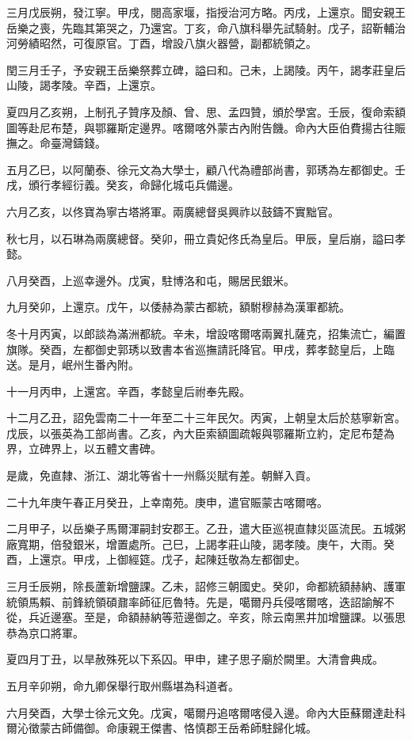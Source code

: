 \begin{pinyinscope}
三月戊辰朔，發江寧。甲戌，閱高家堰，指授治河方略。丙戌，上還京。聞安親王岳樂之喪，先臨其第哭之，乃還宮。丁亥，命八旗科舉先試騎射。戊子，詔靳輔治河勞績昭然，可復原官。丁酉，增設八旗火器營，副都統領之。

閏三月壬子，予安親王岳樂祭葬立碑，謚曰和。己未，上謁陵。丙午，謁孝莊皇后山陵，謁孝陵。辛酉，上還京。

夏四月乙亥朔，上制孔子贊序及顏、曾、思、孟四贊，頒於學宮。壬辰，復命索額圖等赴尼布楚，與鄂羅斯定邊界。喀爾喀外蒙古內附告饑。命內大臣伯費揚古往賑撫之。命臺灣鑄錢。

五月乙巳，以阿蘭泰、徐元文為大學士，顧八代為禮部尚書，郭琇為左都御史。壬戌，頒行孝經衍義。癸亥，命歸化城屯兵備邊。

六月乙亥，以佟寶為寧古塔將軍。兩廣總督吳興祚以鼓鑄不實黜官。

秋七月，以石琳為兩廣總督。癸卯，冊立貴妃佟氏為皇后。甲辰，皇后崩，謚曰孝懿。

八月癸酉，上巡幸邊外。戊寅，駐博洛和屯，賜居民銀米。

九月癸卯，上還京。戊午，以倭赫為蒙古都統，額駙穆赫為漢軍都統。

冬十月丙寅，以郎談為滿洲都統。辛未，增設喀爾喀兩翼扎薩克，招集流亡，編置旗隊。癸酉，左都御史郭琇以致書本省巡撫請託降官。甲戌，葬孝懿皇后，上臨送。是月，岷州生番內附。

十一月丙申，上還宮。辛酉，孝懿皇后祔奉先殿。

十二月乙丑，詔免雲南二十一年至二十三年民欠。丙寅，上朝皇太后於慈寧新宮。戊辰，以張英為工部尚書。乙亥，內大臣索額圖疏報與鄂羅斯立約，定尼布楚為界，立碑界上，以五體文書碑。

是歲，免直隸、浙江、湖北等省十一州縣災賦有差。朝鮮入貢。

二十九年庚午春正月癸丑，上幸南苑。庚申，遣官賑蒙古喀爾喀。

二月甲子，以岳樂子馬爾渾嗣封安郡王。乙丑，遣大臣巡視直隸災區流民。五城粥廠寬期，倍發銀米，增置處所。己巳，上謁孝莊山陵，謁孝陵。庚午，大雨。癸酉，上還京。甲戌，上御經筵。戊子，起陳廷敬為左都御史。

三月壬辰朔，除長蘆新增鹽課。乙未，詔修三朝國史。癸卯，命都統額赫納、護軍統領馬賴、前鋒統領碩鼐率師征厄魯特。先是，噶爾丹兵侵喀爾喀，迭詔諭解不從，兵近邊塞。至是，命額赫納等蒞邊御之。辛亥，除云南黑井加增鹽課。以張思恭為京口將軍。

夏四月丁丑，以旱赦殊死以下系囚。甲申，建子思子廟於闕里。大清會典成。

五月辛卯朔，命九卿保舉行取州縣堪為科道者。

六月癸酉，大學士徐元文免。戊寅，噶爾丹追喀爾喀侵入邊。命內大臣蘇爾達赴科爾沁徵蒙古師備御。命康親王傑書、恪慎郡王岳希師駐歸化城。


\end{pinyinscope}
